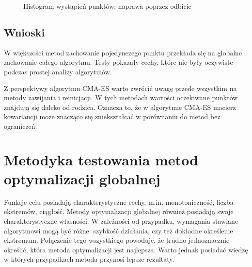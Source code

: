 \documentclass{mini}
\begin{document}
\begin{figure}[H]
\centering
{}
\quad
{}
\caption{Histogram wystąpień punktów; naprawa poprzez odbicie}
\end{figure}

\subsection{Wnioski}
\hspace{3,4ex}W większości metod zachowanie pojedynczego punktu przekłada się na globalne zachowanie całego algorytmu. Testy pokazały cechy, które nie były oczywiste podczas prostej analizy algorytmów.

Z perspektywy algorytmu CMA-ES warto zwrócić uwagę przede wszystkim na metody zawijania i reinicjacji. W tych metodach wartości oczekiwane punktów znajdują się daleko od rodzica. Oznacza to, że w algorytmie CMA-ES macierz kowariancji może znacząco się zniekształcać w porównaniu do metod bez ograniczeń.

\pagebreak

\section{Metodyka testowania metod optymalizacji globalnej}
\hspace{3,4ex}Funkcje celu posiadają charakterystyczne cechy, m.in. monotoniczność, liczba ekstremów, ciągłość. Metody optymalizacji globalnej również posiadają swoje charakterystyczne własności. W zależności od przypadku, wymagania stawiane algorytmowi mogą być różne: szybkość działania, czy też dokładne określenie ekstremum. Połączenie tego wszystkiego powoduje, że trudno jednoznacznie określić, która metoda optymalizacji jest najlepsza. Warto jednak posiadać wiedzę w których przypadkach metoda przynosi lepsze rezultaty.
\end{document}
